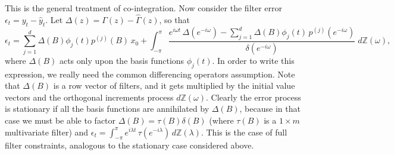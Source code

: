 \documentclass[a4paper]{book}
\def\ZZ{\mathbb Z}
\begin{document}
 This is the general treatment of co-integration.  Now consider the
 filter error $\epsilon_t = y_t - \widehat{y}_t$.  Let $\Delta(z) = \Gamma
 (z) - \widehat{\Gamma} (z)$, so that
\[
 \epsilon_t = \sum_{j=1}^d \Delta(B) \phi_j (t) p^{(j)} (B) \, x_{0} + \int_{-\pi}^{\pi}
 \frac{ e^{i \omega t} \, \Delta (e^{-i \omega})
 - \sum_{j=1}^d \Delta (B) \phi_j (t) \, p^{(j)} ( e^{-i \omega
 } )}{ \delta (e^{-i \omega}) } \; d \ZZ (\omega),
\]
 where $\Delta (B)$ acts only upon the basis functions $\phi_j (t)$.
  In order to write this expression, we really need the common
  differencing operators assumption.  Note that $\Delta (B) $ is a
  row vector of filters, and it gets multiplied by the initial value
  vectors and the orthogonal increments process $d\ZZ(\omega)$.
  Clearly the error process is stationary if all the basis functions
  are annihilated by $\Delta (B)$, because in that case we must be
  able to factor $\Delta (B) = \tau (B) \delta (B)$ (where $\tau (B)$ is
  a $1 \times m$ multivariate filter) and $\epsilon_t
  = \int_{-\pi}^{\pi} e^{i \lambda t } \, \tau (e^{-i \lambda}) \,
  d\ZZ (\lambda)$.  This is the case of full filter constraints,
  analogous to the stationary case considered above. 
\end{document}
